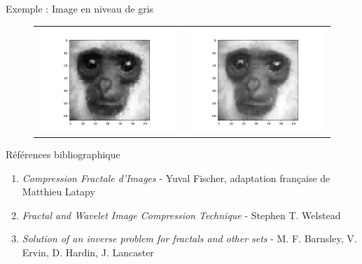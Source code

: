 \documentclass{beamer}
\begin{document}
\begin{frame}{Exemple : Image en niveau de gris}
\begin{center}
\begin{figure}
\begin{tiny}
\begin{tabular}{cc}
\includegraphics[scale=0.23]{images/monkey16-4.png} & 
\includegraphics[scale=0.23]{images/monkey8-4.png} \\
\end{tabular}
\end{tiny}
\end{figure}
\end{center}
\end{frame}

\begin{frame}{Références bibliographique}
\begin{enumerate}
\item \textit{Compression Fractale d'Images} - Yuval Fischer, adaptation française de Matthieu Latapy
\item \textit{Fractal and Wavelet Image Compression Technique} - Stephen T. Welstead
\item \textit{Solution of an inverse problem for fractals and other sets} - M. F. Barnsley, V. Ervin, D. Hardin, J. Lancaster
\end{enumerate}
\end{frame}
\end{document}
